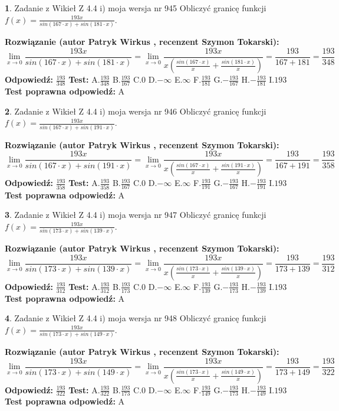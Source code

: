 \documentclass[12pt, a4paper]{article}
\theoremstyle{definition} %
\newtheorem{zad}{}
\newcommand{\zadStart}[1]{\begin{zad}#1\newline}
\newcommand{\zadStop}{\end{zad}}
\newcommand{\rozwStart}[2]{\noindent \textbf{Rozwiązanie (autor #1 , recenzent #2): }\newline}
\newcommand{\rozwStop}{\newline}
\newcommand{\odpStart}{\noindent \textbf{Odpowiedź:}\newline}
\newcommand{\odpStop}{\newline}
\newcommand{\testStart}{\noindent \textbf{Test:}\newline}
\newcommand{\testStop}{\newline}
\newcommand{\kluczStart}{\noindent \textbf{Test poprawna odpowiedź:}\newline}
\newcommand{\kluczStop}{\newline}
\begin{document}
\zadStart{Zadanie z Wikieł Z 4.4 i) moja wersja nr 945}
Obliczyć granicę funkcji $f(x)=\frac{193x}{sin(167\cdot x) +sin(181\cdot x)}$.
\zadStop
\rozwStart{Patryk Wirkus}{Szymon Tokarski}
$$\lim\limits_{x\to 0}\frac{193x}{sin(167\cdot x) +sin(181\cdot x)}=\lim\limits_{x\to 0}\frac{193x}{x(\frac{sin(167\cdot x)}{x}+\frac{sin(181\cdot x)}{x})}=\frac{193}{167+181} = \frac{193}{348}$$
\rozwStop
\odpStart
$\frac{193}{348}$
\odpStop
\testStart
A.$\frac{193}{348}$
B.$\frac{193}{167}$
C.$0$
D.$-\infty$
E.$\infty$
F.$\frac{193}{181}$
G.$-\frac{193}{167}$
H.$-\frac{193}{181}$
I.$193$
\testStop
\kluczStart
A
\kluczStop



\zadStart{Zadanie z Wikieł Z 4.4 i) moja wersja nr 946}
Obliczyć granicę funkcji $f(x)=\frac{193x}{sin(167\cdot x) +sin(191\cdot x)}$.
\zadStop
\rozwStart{Patryk Wirkus}{Szymon Tokarski}
$$\lim\limits_{x\to 0}\frac{193x}{sin(167\cdot x) +sin(191\cdot x)}=\lim\limits_{x\to 0}\frac{193x}{x(\frac{sin(167\cdot x)}{x}+\frac{sin(191\cdot x)}{x})}=\frac{193}{167+191} = \frac{193}{358}$$
\rozwStop
\odpStart
$\frac{193}{358}$
\odpStop
\testStart
A.$\frac{193}{358}$
B.$\frac{193}{167}$
C.$0$
D.$-\infty$
E.$\infty$
F.$\frac{193}{191}$
G.$-\frac{193}{167}$
H.$-\frac{193}{191}$
I.$193$
\testStop
\kluczStart
A
\kluczStop



\zadStart{Zadanie z Wikieł Z 4.4 i) moja wersja nr 947}
Obliczyć granicę funkcji $f(x)=\frac{193x}{sin(173\cdot x) +sin(139\cdot x)}$.
\zadStop
\rozwStart{Patryk Wirkus}{Szymon Tokarski}
$$\lim\limits_{x\to 0}\frac{193x}{sin(173\cdot x) +sin(139\cdot x)}=\lim\limits_{x\to 0}\frac{193x}{x(\frac{sin(173\cdot x)}{x}+\frac{sin(139\cdot x)}{x})}=\frac{193}{173+139} = \frac{193}{312}$$
\rozwStop
\odpStart
$\frac{193}{312}$
\odpStop
\testStart
A.$\frac{193}{312}$
B.$\frac{193}{173}$
C.$0$
D.$-\infty$
E.$\infty$
F.$\frac{193}{139}$
G.$-\frac{193}{173}$
H.$-\frac{193}{139}$
I.$193$
\testStop
\kluczStart
A
\kluczStop



\zadStart{Zadanie z Wikieł Z 4.4 i) moja wersja nr 948}
Obliczyć granicę funkcji $f(x)=\frac{193x}{sin(173\cdot x) +sin(149\cdot x)}$.
\zadStop
\rozwStart{Patryk Wirkus}{Szymon Tokarski}
$$\lim\limits_{x\to 0}\frac{193x}{sin(173\cdot x) +sin(149\cdot x)}=\lim\limits_{x\to 0}\frac{193x}{x(\frac{sin(173\cdot x)}{x}+\frac{sin(149\cdot x)}{x})}=\frac{193}{173+149} = \frac{193}{322}$$
\rozwStop
\odpStart
$\frac{193}{322}$
\odpStop
\testStart
A.$\frac{193}{322}$
B.$\frac{193}{173}$
C.$0$
D.$-\infty$
E.$\infty$
F.$\frac{193}{149}$
G.$-\frac{193}{173}$
H.$-\frac{193}{149}$
I.$193$
\testStop
\kluczStart
A
\kluczStop
\end{document}
